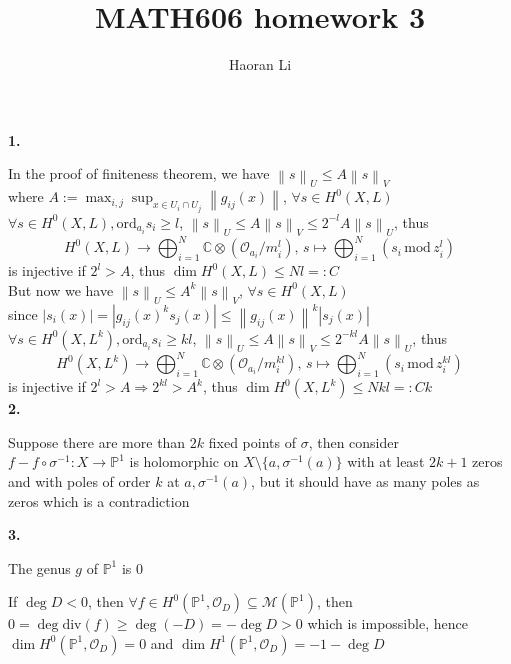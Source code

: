 \documentclass[12pt]{article}
\title{MATH606 homework 3}
\author{Haoran Li}
\date{}
\begin{document}
\maketitle

\textbf{1.} \par
In the proof of finiteness theorem, we have $\left \| s \right \|_U\leq A\left \| s \right \|_V$ \\
where $A:=\displaystyle\max_{i,j}\sup_{x\in U_i\cap U_j}\left \| g_{ij}(x) \right \|$, $\forall s\in H^0(X,L)$ \\
$\forall s\in H^0(X,L), \mathrm{ord}_{a_i}s_i\geq l$, $\left \| s \right \|_U\leq A\left \| s \right \|_V\leq 2^{-l}A\left \| s \right \|_U$, thus $$H^0(X,L)\rightarrow \displaystyle\bigoplus_{i=1}^{N}\mathbb{C}\otimes\left(\mathcal{O}_{a_i}/m_i^{l}\right),\,s\mapsto\displaystyle\bigoplus_{i=1}^{N}\left(s_i\,\mathrm{mod}\,z_i^l\right)$$
is injective if $2^l>A$, thus $\dim H^0(X,L)\leq Nl=:C$ \\
But now we have $\left \| s \right \|_U\leq A^k\left \| s \right \|_V$, $\forall s\in H^0(X,L)$ \\
since $|s_i(x)|=|g_{ij}(x)^ks_j(x)|\leq \left \| g_{ij}(x) \right \|^k|s_j(x)|$ \\
$\forall s\in H^0(X,L^k), \mathrm{ord}_{a_i}s_i\geq kl$, $\left \| s \right \|_U\leq A\left \| s \right \|_V\leq 2^{-kl}A\left \| s \right \|_U$, thus $$H^0(X,L^k)\rightarrow \displaystyle\bigoplus_{i=1}^{N}\mathbb{C}\otimes\left(\mathcal{O}_{a_i}/m_i^{kl}\right),\,s\mapsto\displaystyle\bigoplus_{i=1}^{N}\left(s_i\,\mathrm{mod}\,z_i^{kl}\right)$$
is injective if $2^l>A\Rightarrow 2^{kl}>A^k$, thus $\dim H^0(X,L^k)\leq Nkl=:Ck$ \\
\textbf{2.} \par
Suppose there are more than $2k$ fixed points of $\sigma$, then consider $f-f\circ\sigma^{-1}: X\rightarrow\mathbb{P}^1$ is holomorphic on $X\setminus\{a,\sigma^{-1}(a)\}$ with at least $2k+1$ zeros and with poles of order $k$ at $a, \sigma^{-1}(a)$, but it should have as many poles as zeros which is a contradiction \par
\textbf{3.} \par
The genus $g$ of $\mathbb{P}^1$ is $0$ \par
If $\deg D<0$, then $\forall f\in H^0(\mathbb{P}^1,\mathcal{O}_D)\subseteq\mathcal{M}(\mathbb{P}^1)$, then $0=\deg\mathrm{div}(f)\geq \deg(-D)=-\deg D>0$ which is impossible, hence $\dim H^0(\mathbb{P}^1,\mathcal{O}_D)=0$ and $\dim H^1(\mathbb{P}^1,\mathcal{O}_D)=-1-\deg D$ \par
\end{document}
